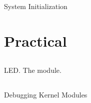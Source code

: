 \documentclass{workshop}
\begin{document}
\begin{frame}{System Initialization}
\end{frame}

\section{Practical}

\subsection{}
\begin{frame}{LED. The module.}
\end{frame}

\subsection{}
\begin{frame}{Debugging Kernel Modules}
\end{frame}
\end{document}
